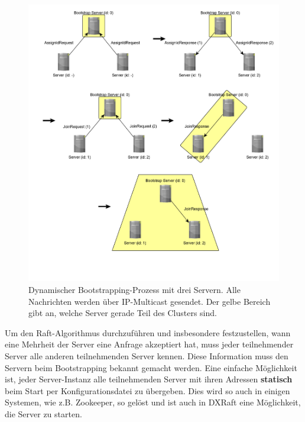 \begin{figure}[p]
	\centering
	\includegraphics[width=\linewidth]{img/bootstrap.png}
	\caption{Dynamischer Bootstrapping-Prozess mit drei Servern. Alle Nachrichten werden über IP-Multicast gesendet. Der gelbe Bereich gibt an, welche Server gerade Teil des Clusters sind.}
	\label{fig:bootstrap}
\end{figure}

Um den Raft-Algorithmus durchzuführen und insbesondere festzustellen, wann eine Mehrheit der Server eine Anfrage akzeptiert hat, muss jeder teilnehmender Server alle anderen teilnehmenden Server kennen. Diese Information muss den Servern beim Bootstrapping bekannt gemacht werden. Eine einfache Möglichkeit ist, jeder Server-Instanz alle teilnehmenden Server mit ihren Adressen \textbf{statisch} beim Start per Konfigurationsdatei zu übergeben. Dies wird so auch in einigen Systemen, wie z.B. Zookeeper, so gelöst und ist auch in DXRaft eine Möglichkeit, die Server zu starten. 

